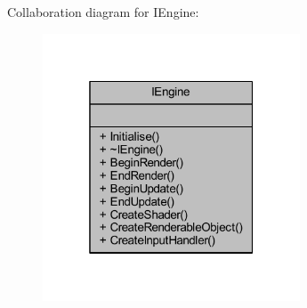 Collaboration diagram for I\+Engine\+:\nopagebreak
\begin{figure}[H]
\begin{center}
\leavevmode
\includegraphics[width=217pt]{class_i_engine__coll__graph}
\end{center}
\end{figure}
